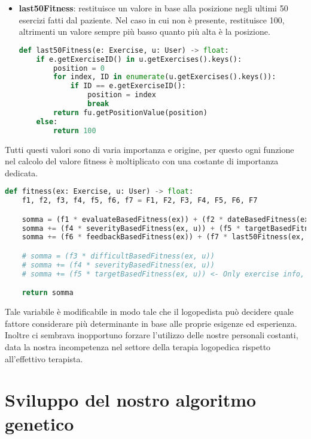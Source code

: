 \documentclass{article}
\begin{document}
\begin{itemize}
\item\textbf{last50Fitness}: restituisce un valore in base alla posizione negli ultimi 50 esercizi fatti dal paziente. Nel caso in cui non è presente, restituisce 100, altrimenti un valore sempre più basso quanto più alta è la posizione.
\begin{lstlisting}[language = Python]
    def last50Fitness(e: Exercise, u: User) -> float:
    if e.getExerciseID() in u.getExercises().keys():
        position = 0
        for index, ID in enumerate(u.getExercises().keys()):
            if ID == e.getExerciseID():
                position = index
                break
        return fu.getPositionValue(position)
    else:
        return 100
\end{lstlisting}
\end{itemize}

\pagebreak

Tutti questi valori sono di varia importanza e origine, per questo ogni funzione nel calcolo del valore fitness è moltiplicato con una costante di importanza dedicata.
\begin{lstlisting}[language = Python]
    def fitness(ex: Exercise, u: User) -> float:
    f1, f2, f3, f4, f5, f6, f7 = F1, F2, F3, F4, F5, F6, F7

    somma = (f1 * evaluateBasedFitness(ex)) + (f2 * dateBasedFitness(ex, MDAYS)) + (f3 * difficultBasedFitness(ex, u))
    somma += (f4 * severityBasedFitness(ex, u)) + (f5 * targetBasedFitness(ex, u))
    somma += (f6 * feedbackBasedFitness(ex)) + (f7 * last50Fitness(ex, u))

    # somma = (f3 * difficultBasedFitness(ex, u))
    # somma += (f4 * severityBasedFitness(ex, u))
    # somma += (f5 * targetBasedFitness(ex, u)) <- Only exercise info, ignores executions from user

    return somma
\end{lstlisting}

Tale variabile è modificabile in modo tale che il logopedista può decidere quale fattore considerare più determinante in base alle proprie esigenze ed esperienza. Inoltre ci sembrava inopportuno forzare l'utilizzo delle nostre personali costanti, data la nostra incompetenza nel settore della terapia logopedica rispetto all'effettivo terapista.

\pagebreak


\section{Sviluppo del nostro algoritmo genetico}
\end{document}
